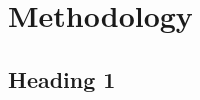 \section{Methodology}
\label{sec:methodology}

\subsection{Heading 1}
\label{subsec:heading-1-met}

